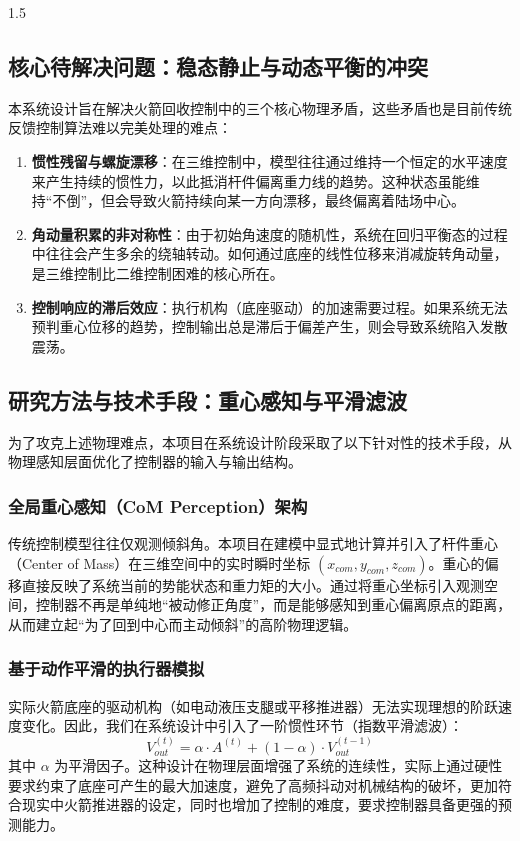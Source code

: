 \documentclass[zihao=-4]{ctexart}
\begin{document}
\begin{spacing}{1.5}
\subsection{核心待解决问题：稳态静止与动态平衡的冲突}
本系统设计旨在解决火箭回收控制中的三个核心物理矛盾，这些矛盾也是目前传统反馈控制算法难以完美处理的难点：

\begin{enumerate}
    \item \textbf{惯性残留与螺旋漂移}：在三维控制中，模型往往通过维持一个恒定的水平速度来产生持续的惯性力，以此抵消杆件偏离重力线的趋势。这种状态虽能维持“不倒”，但会导致火箭持续向某一方向漂移，最终偏离着陆场中心。
    \item \textbf{角动量积累的非对称性}：由于初始角速度的随机性，系统在回归平衡态的过程中往往会产生多余的绕轴转动。如何通过底座的线性位移来消减旋转角动量，是三维控制比二维控制困难的核心所在。
    \item \textbf{控制响应的滞后效应}：执行机构（底座驱动）的加速需要过程。如果系统无法预判重心位移的趋势，控制输出总是滞后于偏差产生，则会导致系统陷入发散震荡。
\end{enumerate}

\subsection{研究方法与技术手段：重心感知与平滑滤波}
为了攻克上述物理难点，本项目在系统设计阶段采取了以下针对性的技术手段，从物理感知层面优化了控制器的输入与输出结构。

\subsubsection{全局重心感知（CoM Perception）架构}

传统控制模型往往仅观测倾斜角。本项目在建模中显式地计算并引入了杆件重心（Center of Mass）在三维空间中的实时瞬时坐标 $(x_{com}, y_{com}, z_{com})$。重心的偏移直接反映了系统当前的势能状态和重力矩的大小。通过将重心坐标引入观测空间，控制器不再是单纯地“被动修正角度”，而是能够感知到重心偏离原点的距离，从而建立起“为了回到中心而主动倾斜”的高阶物理逻辑。

\subsubsection{基于动作平滑的执行器模拟}
实际火箭底座的驱动机构（如电动液压支腿或平移推进器）无法实现理想的阶跃速度变化。因此，我们在系统设计中引入了一阶惯性环节（指数平滑滤波）：
\begin{equation}
V_{out}^{(t)} = \alpha \cdot A^{(t)} + (1-\alpha) \cdot V_{out}^{(t-1)}
\end{equation}
其中 $\alpha$ 为平滑因子。这种设计在物理层面增强了系统的连续性，实际上通过硬性要求约束了底座可产生的最大加速度，避免了高频抖动对机械结构的破坏，更加符合现实中火箭推进器的设定，同时也增加了控制的难度，要求控制器具备更强的预测能力。


\end{spacing}
\end{document}

